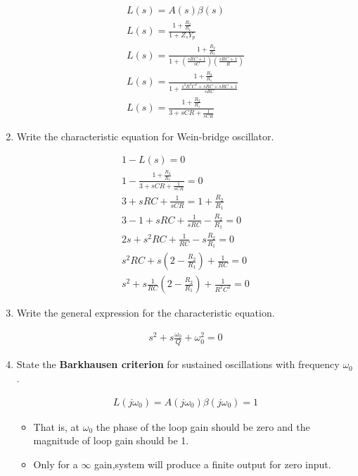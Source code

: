 \begin{enumerate}[label=\thesubsection.\arabic*.,ref=\thesubsection.\theenumi]
\solution
\begin{align}
    L(s) = A(s) \beta(s) \\ 
    L(s) = \frac{1+\frac{R_2}{R_1}}{1 + Z_s Y_p} \\
    L(s) = \frac{1+\frac{R_2}{R_1}}{1 + (\frac{sRC + 1}{sC}) (\frac{sRC+1}{R})} \\
    L(s) = \frac{1+\frac{R_2}{R_1}}{1 + \frac{s^2R^2C^2 +sRC + sRC + 1}{sRC}} \\
    L(s) = \frac{1 + \frac{R_2}{R_1}}{3 + sCR + \frac{1}{sCR}} \label{eq:ee18btech11044_3_1}
\end{align}

\item Write the characteristic equation for Wein-bridge oscillator.

\solution
\begin{align}
    1 - L(s) = 0  \\
    1 - \frac{1 + \frac{R_2}{R_1}}{3 + sCR + \frac{1}{sCR}} = 0  \\
    3 + sRC + \frac{1}{sCR} = 1 + \frac{R_2}{R_1}  \\
    3 - 1 +sRC +\frac{1}{sRC} -\frac{R_2}{R_1} = 0  \\
    2s + s^2 RC + \frac{1}{RC} -s\frac{R_2}{R_1} = 0  \\
    s^2 RC + s(2 - \frac{R_2}{R_1}) + \frac{1}{RC} =0 \\
    s^2 + s \frac{1}{RC}(2-\frac{R_2}{R_1}) + \frac{1}{R^2C^2} = 0 \label{eq:ee18btech11044_3_2}
\end{align}

\item
Write the general expression for the characteristic equation.

\solution
\begin{align}
    s^2 + s\frac{\omega_0}{Q} + \omega_0^2 = 0 \label{eq:ee18btech11044_3_3}
\end{align}

\item State the \textbf{Barkhausen criterion} for sustained oscillations with frequency $\omega_0$.

\solution
\begin{align}
    L(j\omega_0) = A(j\omega_0) \beta(j\omega_0) = 1
\end{align}
\begin{itemize}
    \item That is, at $\omega_0$ the phase of the loop gain should be zero and the magnitude of loop gain should be 1.
    \item Only for a $\infty$ gain,system will produce a finite output for zero input. 
\end{itemize}


\end{enumerate}
